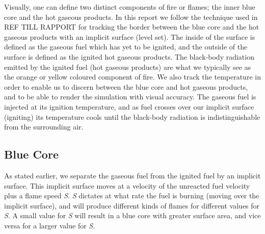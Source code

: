 Visually, one can define two distinct components of fire or flames; the inner blue core and the hot gaseous products. In this report we follow the technique used in REF TILL RAPPORT for tracking the border between the blue core and the hot gaseous products with an implicit surface (level set). The inside of the surface is defined as the gaseous fuel which has yet to be ignited, and the outside of the surface is defined as the ignited hot gaseous products. The black-body radiation emitted by the ignited fuel (hot gaseous products) are what we typically see as the orange or yellow coloured component of fire. We also track the temperature in order to enable us to discern between the blue core and hot gaseous products, and to be able to render the simulation with visual accuracy. The gaseous fuel is injected at its ignition temperature, and as fuel crosses over our implicit surface (igniting) its temperature cools until the black-body radiation is indistinguishable from the surrounding air.
\subsection{Blue Core}
As stated earlier, we separate the gaseous fuel from the ignited fuel by an implicit surface. This implicit surface moves at a velocity of the unreacted fuel velocity plus a flame speed \emph{S}. \emph{S} dictates at what rate the fuel is burning (moving over the implicit surface), and will produce different kinds of flames for different values for \emph{S}. A small value for \emph{S} will result in a blue core with greater surface area, and vice versa for a larger value for \emph{S}.
